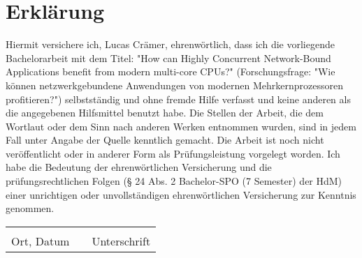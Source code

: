 \cleardoublepage
\section*{Erklärung}

Hiermit versichere ich, Lucas Crämer, ehrenwörtlich, dass ich die vorliegende Bachelorarbeit mit dem Titel: "How can Highly Concurrent Network-Bound Applications benefit from modern multi-core CPUs?" (Forschungsfrage: "Wie können netzwerkgebundene Anwendungen von modernen Mehrkernprozessoren profitieren?") selbstständig und ohne fremde Hilfe verfasst und keine anderen als die angegebenen Hilfsmittel benutzt habe. Die Stellen der Arbeit, die dem Wortlaut oder dem Sinn nach anderen Werken entnommen wurden, sind in jedem Fall unter Angabe der Quelle kenntlich gemacht. Die Arbeit ist noch nicht veröffentlicht oder in anderer Form als Prüfungsleistung vorgelegt worden.\newline
Ich habe die Bedeutung der ehrenwörtlichen Versicherung und die prüfungsrechtlichen Folgen (§ 24 Abs. 2 Bachelor-SPO (7 Semester) der HdM) einer unrichtigen oder unvollständigen ehrenwörtlichen Versicherung zur Kenntnis genommen.


\vspace{4\baselineskip}

\begin{tabular}{lp{2em}l}
 \hspace{5cm}   && \hspace{4cm} \\
 \cline{1-1}\cline{3-3}
 Ort, Datum     && Unterschrift
\end{tabular} 
